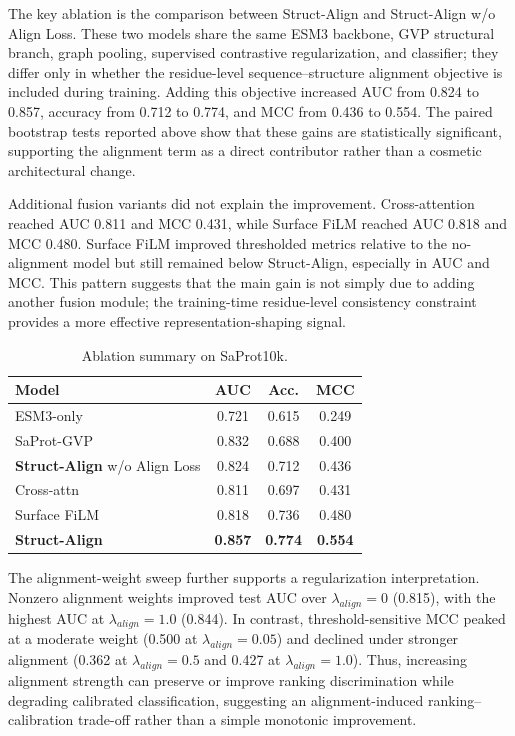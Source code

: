 \documentclass[conference]{IEEEtran}
\begin{document}
The key ablation is the comparison between Struct-Align and Struct-Align w/o Align Loss. These two models share the same ESM3 backbone, GVP structural branch, graph pooling, supervised contrastive regularization, and classifier; they differ only in whether the residue-level sequence--structure alignment objective is included during training. Adding this objective increased AUC from 0.824 to 0.857, accuracy from 0.712 to 0.774, and MCC from 0.436 to 0.554. The paired bootstrap tests reported above show that these gains are statistically significant, supporting the alignment term as a direct contributor rather than a cosmetic architectural change.

Additional fusion variants did not explain the improvement. Cross-attention reached AUC 0.811 and MCC 0.431, while Surface FiLM reached AUC 0.818 and MCC 0.480. Surface FiLM improved thresholded metrics relative to the no-alignment model but still remained below Struct-Align, especially in AUC and MCC. This pattern suggests that the main gain is not simply due to adding another fusion module; the training-time residue-level consistency constraint provides a more effective representation-shaping signal.

\begin{table}[t]
\centering
\caption{Ablation summary on SaProt10k.}
\label{tab:ablation}
\begin{tabular}{lccc}
\toprule
Model & AUC & Acc. & MCC \\
\midrule
ESM3-only & 0.721 & 0.615 & 0.249 \\
SaProt-GVP & 0.832 & 0.688 & 0.400 \\
\textbf{Struct-Align} w/o Align Loss & 0.824 & 0.712 & 0.436 \\
Cross-attn & 0.811 & 0.697 & 0.431 \\
Surface FiLM & 0.818 & 0.736 & 0.480 \\
\rowcolor{gray!12}\textbf{Struct-Align} & \textbf{0.857} & \textbf{0.774} & \textbf{0.554} \\
\bottomrule
\end{tabular}
\end{table}

The alignment-weight sweep further supports a regularization interpretation. Nonzero alignment weights improved test AUC over $\lambda_{align}=0$ (0.815), with the highest AUC at $\lambda_{align}=1.0$ (0.844). In contrast, threshold-sensitive MCC peaked at a moderate weight (0.500 at $\lambda_{align}=0.05$) and declined under stronger alignment (0.362 at $\lambda_{align}=0.5$ and 0.427 at $\lambda_{align}=1.0$). Thus, increasing alignment strength can preserve or improve ranking discrimination while degrading calibrated classification, suggesting an alignment-induced ranking--calibration trade-off rather than a simple monotonic improvement.
\end{document}

